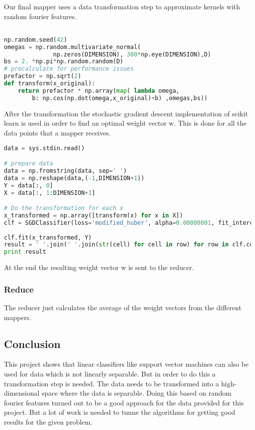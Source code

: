 \documentclass[a4paper, 11pt]{article}
\begin{document}
Our final mapper uses a data transformation step to approximate kernels with random fourier features.

\begin{lstlisting}[language=Python]

np.random.seed(42)
omegas = np.random.multivariate_normal(
              np.zeros(DIMENSION), 300*np.eye(DIMENSION),D)
bs = 2. *np.pi*np.random.random(D)
# precalculate for performance issues
prefactor = np.sqrt(2) 
def transform(x_original):
	return prefactor * np.array(map( lambda omega,
		b: np.cos(np.dot(omega,x_original)+b) ,omegas,bs))

\end{lstlisting}

After the transformation the stochastic gradient descent implementation of scikit learn is used in order to find an optimal weight vector w. This is done for all the data points that a mapper receives.

\begin{lstlisting}[language=Python]
data = sys.stdin.read()

# prepare data
data = np.fromstring(data, sep=' ')
data = np.reshape(data,(-1,DIMENSION+1))
Y = data[:, 0]
X = data[:, 1:DIMENSION+1]

# Do the transformation for each x
x_transformed = np.array([transform(x) for x in X])
clf = SGDClassifier(loss='modified_huber', alpha=0.00000001, fit_intercept=False, average=True, n_iter=10, n_jobs=-1, penalty="l2")
    
clf.fit(x_transformed, Y)
result = ' '.join(' '.join(str(cell) for cell in row) for row in clf.coef_)
print result

\end{lstlisting}

At the end the resulting weight vector w is sent to the reducer.

\subsubsection{Reduce}

The reducer just calculates the average of the weight vectors from the different mappers. 


\subsection{Conclusion}

This project shows that linear classifiers like support vector machines can also be used for data which is not linearly separable. But in order to do this a transformation step is needed. The data needs to be transformed into a high-dimensional space where the data is separable. Doing this based on random fourier features turned out to be a good approach for the data provided for this project. But a lot
of work is needed to tunne the algorithms for getting good results for the given problem.
\end{document}
